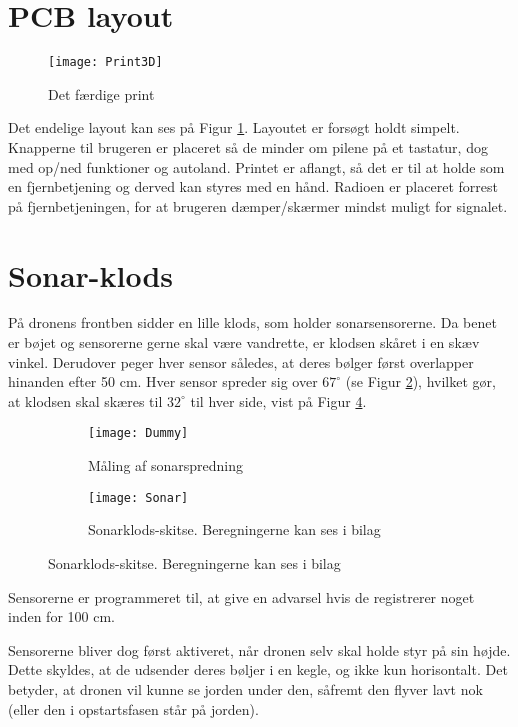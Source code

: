 \documentclass[Main]{subfiles}
\begin{document}
\section{PCB layout}

\begin{figure}[H]
\centering
\texttt{[image: Print3D]}
\caption{Det færdige print}
\label{fig: Print3D}
\end{figure}
Det endelige layout kan ses på Figur \ref{fig: Print3D}.
Layoutet er forsøgt holdt simpelt. 
Knapperne til brugeren er placeret så de minder om pilene på et tastatur, dog med op/ned funktioner og autoland.
Printet er aflangt, så det er til at holde som en fjernbetjening og derved kan styres med en hånd.
Radioen er placeret forrest på fjernbetjeningen, for at brugeren dæmper/skærmer mindst muligt for signalet.  


\newpage
\section{Sonar-klods}\label{Sec:Sonar}
På dronens frontben sidder en lille klods, som holder sonarsensorerne.
Da benet er bøjet og sensorerne gerne skal være vandrette, er klodsen skåret i en skæv vinkel.
Derudover peger hver sensor således, at deres bølger først overlapper hinanden efter 50 cm.
Hver sensor spreder sig over $67^\circ$ (se Figur \ref{Fig:SonarMeasure}), hvilket gør, at klodsen skal skæres til $32^\circ$ til hver side, vist på Figur \ref{Fig:SonarSkitse}.
\begin{figure}[H]
\centering
	\begin{subfigure}[b]{0.45\textwidth}
		\texttt{[image: Dummy]}
		\caption{Måling af sonarspredning}
		\label{Fig:SonarMeasure}
	\end{subfigure}
	\quad
	\begin{subfigure}[b]{0.45\textwidth}
	\centering
		\texttt{[image: Sonar]}
		\caption{Sonarklods-skitse. Beregningerne kan ses i bilag\cite{Klods}}
		\label{Fig:SonarSkitse}
	\end{subfigure}
\end{figure}

Sensorerne er programmeret til, at give en advarsel hvis de registrerer noget inden for 100 cm.

Sensorerne bliver dog først aktiveret, når dronen selv skal holde styr på sin højde. Dette skyldes, at de udsender deres bøljer i en kegle, og ikke kun horisontalt. 
Det betyder, at dronen vil kunne se jorden under den, såfremt den flyver lavt nok (eller den i opstartsfasen står på jorden).
\end{document}
